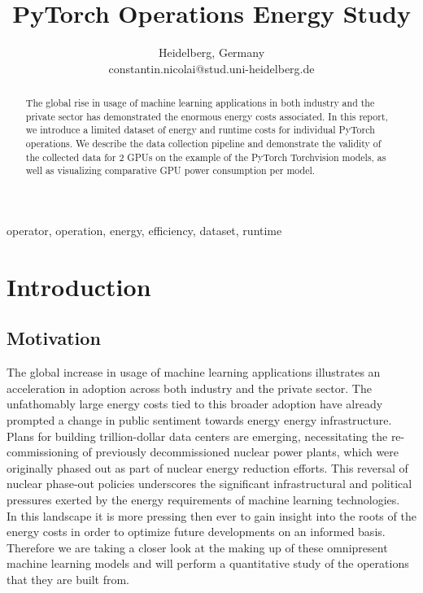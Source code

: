 \documentclass[conference]{IEEEtran}
\begin{document}
\title{PyTorch Operations Energy Study}

\author{
Heidelberg, Germany \\
constantin.nicolai@stud.uni-heidelberg.de}


\maketitle

\begin{abstract}
The global rise in usage of machine learning applications in both industry and the private sector has demonstrated the enormous energy costs associated. In this report, we introduce a limited dataset of energy and runtime costs for individual PyTorch operations. We describe the data collection pipeline and demonstrate the validity of the collected data for 2 GPUs on the example of the PyTorch Torchvision models, as well as visualizing comparative GPU power consumption per model.
\end{abstract}

\begin{IEEEkeywords}
operator, operation, energy, efficiency, dataset, runtime
\end{IEEEkeywords}

\section{Introduction}


\subsection{Motivation}
The global increase in usage of machine learning applications illustrates an acceleration in adoption across both industry and the private sector. The unfathomably large energy costs tied to this broader adoption have already prompted a change in public sentiment towards energy energy infrastructure.  Plans for building trillion-dollar data centers are emerging, necessitating the re-commissioning of previously decommissioned nuclear power plants, which were originally phased out as part of nuclear energy reduction efforts. This reversal of nuclear phase-out policies underscores the significant infrastructural and political pressures exerted by the energy requirements of machine learning technologies.\\
In this landscape it is more pressing then ever to gain insight into the roots of the energy costs in order to optimize future developments on an informed basis. Therefore we are taking a closer look at the making up of these omnipresent machine learning models and will perform a quantitative study of the operations that they are built from.
\end{document}
